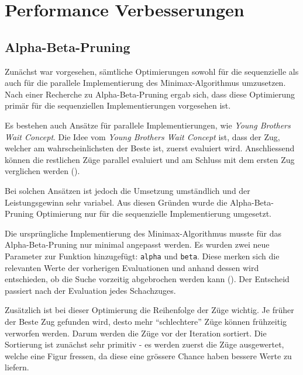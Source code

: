 \section{Performance Verbesserungen}

\subsection{Alpha-Beta-Pruning}
Zunächst war vorgesehen, sämtliche Optimierungen sowohl für die sequenzielle als auch für die parallele Implementierung des Minimax-Algorithmus umzusetzen.
Nach einer Recherche zu Alpha-Beta-Pruning ergab sich, dass diese Optimierung primär für die sequenziellen Implementierungen vorgesehen ist.

Es bestehen auch Ansätze für parallele Implementierungen, wie \textit{Young Brothers Wait Concept}.
Die Idee vom \textit{Young Brothers Wait Concept} ist, dass der Zug, welcher am wahrscheinlichsten der Beste ist, zuerst evaluiert wird.
Anschliessend können die restlichen Züge parallel evaluiert und am Schluss mit dem ersten Zug verglichen werden (\cite{alphabetaybwc}).

Bei solchen Ansätzen ist jedoch die Umsetzung umständlich und der Leistungsgewinn sehr variabel.
Aus diesen Gründen wurde die Alpha-Beta-Pruning Optimierung nur für die sequenzielle Implementierung umgesetzt.

Die ursprüngliche Implementierung des Minimax-Algorithmus musste für das Alpha-Beta-Pruning nur minimal angepasst werden.
Es wurden zwei neue Parameter zur Funktion hinzugefügt: \texttt{alpha} und \texttt{beta}.
Diese merken sich die relevanten Werte der vorherigen Evaluationen und anhand dessen wird entschieden, ob die Suche vorzeitig abgebrochen werden kann (\cite{alphabetachessprogramming}).
Der Entscheid passiert nach der Evaluation jedes Schachzuges.


Zusätzlich ist bei dieser Optimierung die Reihenfolge der Züge wichtig. Je früher der Beste Zug gefunden wird, desto mehr
\enquote{schlechtere} Züge können frühzeitig verworfen werden. Darum werden die Züge vor der Iteration sortiert.
Die Sortierung ist zunächst sehr primitiv - es werden zuerst die Züge ausgewertet, welche eine Figur fressen, da diese eine grössere Chance haben bessere Werte zu liefern.


